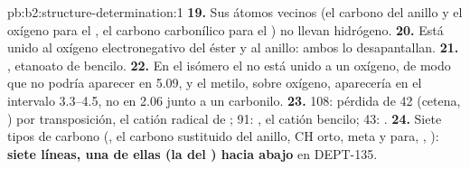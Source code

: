 \begin{solution}{pb:b2:structure-determination:1}
\textbf{19.} Sus átomos vecinos (el carbono del anillo y el oxígeno para el , el carbono carbonílico
para el ) no llevan hidrógeno.
\textbf{20.} Está unido al oxígeno electronegativo del éster y al anillo: ambos lo desapantallan.
\textbf{21.} , etanoato de bencilo.
\textbf{22.} En el isómero el  no está unido a un oxígeno, de modo que no podría aparecer en 5.09, y el
metilo, sobre oxígeno, aparecería en el intervalo 3.3--4.5, no en 2.06 junto a un carbonilo.
\textbf{23.} 108: pérdida de 42 (cetena, ) por transposición, el catión radical de
; 91: , el catión bencilo; 43: .
\textbf{24.} Siete tipos de carbono (, el carbono sustituido del anillo, CH orto, meta y para,
, ): \textbf{siete líneas, una de ellas (la del ) hacia abajo} en DEPT-135.
\end{solution}
